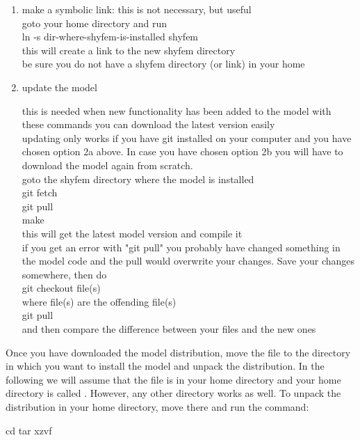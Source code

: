 \begin{enumerate}
\item make a symbolic link: 	
this is not necessary, but useful\\
	goto your home directory and run\\
		ln -s dir-where-shyfem-is-installed shyfem\\
	this will create a link to the new shyfem directory\\
	be sure you do not have a shyfem directory (or link) in your home

\item update the model

	this is needed when new functionality has been added to the model with these commands you can download the latest version easily\\

	updating only works if you have git installed on your computer and you have chosen option 2a above. In case you have chosen 	option 2b you will have to download the model again from scratch.\\

	goto the shyfem directory where the model is installed\\
		git fetch\\
		git pull\\
		make\\

	this will get the latest model version and compile it\\

	if you get an error with "git pull" you probably have changed something in the model code and the pull would overwrite your changes. Save your changes somewhere, then do\\
		git checkout file(s)\\
	where file(s) are the offending file(s)\\
		git pull\\
	and then compare the difference between your files and the new ones\\
\end{enumerate}


Once you have downloaded the model distribution, move the file to
the directory in which you want to install the model and unpack the
distribution. In the following we will assume that the file is in your
home directory and your home directory is called \ttt{\basedir}. However,
any other directory works as well. To unpack the distribution
in your home directory, move there and run the command:

\begin{codem}
    cd \basedir
    tar xzvf \shydist
\end{codem}

